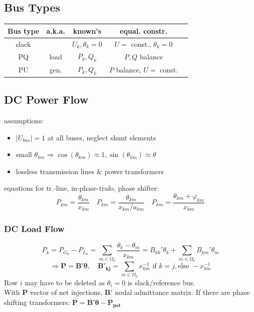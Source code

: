 \documentclass[a4paper,10pt,landscape]{scrartcl}
\begin{document}
\begin{multicols*}{3}
\subsection{Bus Types}
\vspace{-.5cm}
\begin{table}[H]
    \centering
    \begin{tabular}{c|c|c|c|c}
         Bus type&  a.k.a.& known's & equal. constr. & \\ \hline
         slack&  & $U_k,\theta_k=0$ & $U=$ const., $\theta_k=0$ & \\
         PQ&  load& $P_k,Q_k$ & $P,Q$ balance & \\
         PU&  gen.& $P_k,Q_k$ & $P$ balance, $U=$ const. &
    \end{tabular}
\end{table}
\vspace{-.5cm}

\subsection{DC Power Flow}
assumptions:
\begin{itemize}
    \item $|U_{bus}|=1$ at all buses, neglect shunt elements
    \item small $\theta_{km}\Rightarrow \cos(\theta_{km})\approx1, \sin(\theta_{km})\approx \theta$
    \item lossless transmission lines \& power transformers
\end{itemize}
equations for tr.-line, in-phase-trafo, phase shifter:
$$P_{km}=\frac{\theta_{km}}{x_{km}} \quad P_{km}=\frac{\theta_{km}}{x_{km}/a_{km}} \quad P_{km}=\frac{\theta_{km}+\varphi_{km}}{x_{km}}$$
\subsubsection{DC Load Flow}
$$P_k=P_{G_{k}}-P_{L_{k}} = \underset{m\in\Omega_k}{\sum}\frac{\theta_k-\theta_m}{x_{km}}=B_{kk}'\theta_k + \underset{m\in\Omega_k}{\sum}B_{km}'\theta_m$$
$$\Rightarrow \mathbf{P=B'\theta}, \quad \mathbf{B'_{kj}}=\sum_{m\in\Omega_k}x_{km}^{-1} \text{ if } k=j, \text{else } -x_{km}^{-1}$$
Row $i$ may have to be deleted as $\theta_i=0$ is slack/reference bus. \\
With $\mathbf{P}$ vector of net injections, $\mathbf{B'}$ nodal admittance matrix. If there are phase shifting transformers: $\mathbf{P=B'\theta-P_{pst}}$


\end{multicols*}
\end{document}
